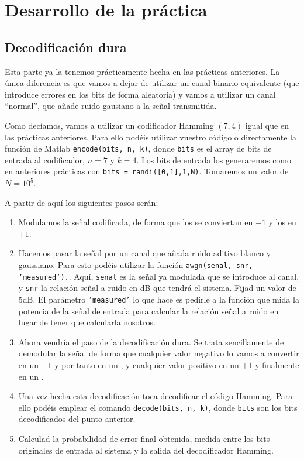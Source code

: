 \documentclass[es,practica,12pt]{uah}
\begin{document}
\section{Desarrollo de la práctica}

\subsection{Decodificación dura}

Esta parte ya la tenemos prácticamente hecha en las prácticas anteriores. La única diferencia es que vamos a dejar de utilizar un canal binario equivalente (que introduce errores en los bits de forma aleatoria) y vamos a utilizar un canal ``normal'', que añade ruido gausiano a la señal transmitida. 

Como decíamos, vamos a utilizar un codificador Hamming $(7,4)$ igual que en las prácticas anteriores. Para ello podéis utilizar vuestro código o directamente la función de Matlab \texttt{encode(bits, n, k)}, donde \texttt{bits} es el array de bits de entrada al codificador, $n=7$ y $k=4$. Los bits de entrada los generaremos como en anteriores prácticas con \texttt{bits = randi([0,1],1,N)}. Tomaremos un valor de $N=10^5$.

A partir de aquí los siguientes pasos serán: 

\begin{enumerate}
	\item Modulamos la señal codificada, de forma que los  se conviertan en $-1$ y los  en $+1$.
	\item Hacemos pasar la señal por un canal que añada ruido aditivo blanco y gaussiano. Para esto podéis utilizar la función \texttt{awgn(senal, snr, 'measured').}. Aquí, \texttt{senal} es la señal ya modulada que se introduce al canal, y \texttt{snr} la relación señal a ruido en dB que tendrá el sistema. Fijad un valor de 5dB. El parámetro \texttt{'measured'} lo que hace es pedirle a la función que mida la potencia de la señal de entrada para calcular la relación señal a ruido en lugar de tener que calcularla nosotros.
	\item Ahora vendría el paso de la decodificación dura. Se trata sencillamente de demodular la señal de forma que cualquier valor negativo lo vamos a convertir en un $-1$ y por tanto en un , y cualquier valor positivo en un $+1$ y finalmente en un . 
	\item Una vez hecha esta decodificación toca decodificar el código Hamming. Para ello podéis emplear el comando \texttt{decode(bits, n, k)}, donde \texttt{bits} son los bits decodificados del punto anterior. 
	\item Calculad la probabilidad de error final obtenida, medida entre los bits originales de entrada al sistema y la salida del decodificador Hamming.
\end{enumerate}
\end{document}
